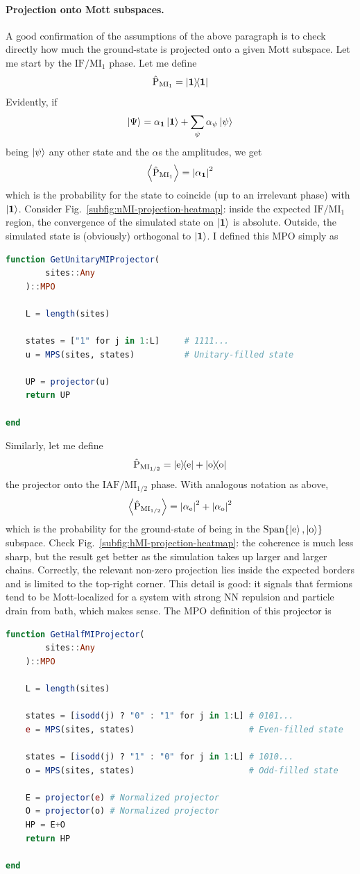\paragraph{Projection onto Mott subspaces.} A good confirmation of the assumptions of the above paragraph is to check directly how much the ground-state is projected onto a given Mott subspace. Let me start by the $\mathrm{IF}/\mathrm{MI}_1$ phase. Let me define
\[
	\hat{\mathrm{P}}_{\mathrm{MI}_1} = \op{\bm{1}}{\bm{1}}
\]
Evidently, if
\[
	\ket{\Psi} = \alpha_{\bm{1}} \ket{\bm{1}} + \sum_\psi \alpha_\psi \ket{\psi}
\]
being $\ket{\psi}$ any other state and the $\alpha$s the amplitudes, we get
\[
	\ev{\hat{\mathrm{P}}_{\mathrm{MI}_1}} = \abs{\alpha_{\bm{1}}}^2
\]
which is the probability for the state to coincide (up to an irrelevant phase) with $\ket{\bm{1}}$. Consider Fig.~\ref{subfig:uMI-projection-heatmap}: inside the expected $\mathrm{IF}/\mathrm{MI}_1$ region, the convergence of the simulated state on $\ket{\bm{1}}$ is absolute. Outside, the simulated state is (obviously) orthogonal to $\ket{\bm{1}}$. I defined this MPO simply as
\begin{lstlisting}[language=julia]
function GetUnitaryMIProjector(
		sites::Any
	)::MPO

	L = length(sites)
	
	states = ["1" for j in 1:L]		# 1111...
	u = MPS(sites, states)			# Unitary-filled state
	
	UP = projector(u)
	return UP

end
\end{lstlisting}

Similarly, let me define 
\[
	\hat{\mathrm{P}}_{\mathrm{MI}_{1/2}} = \op{\mathrm{e}}{\mathrm{e}} + \op{\mathrm{o}}{\mathrm{o}}
\]
the projector onto the $\mathrm{IAF}/\mathrm{MI}_{1/2}$ phase. With analogous notation as above,
\[
	\ev{\hat{\mathrm{P}}_{\mathrm{MI}_{1/2}}} = \abs{\alpha_\mathrm{e}}^2  + \abs{\alpha_\mathrm{o}}^2
\]
which is the probability for the ground-state of being in the $\mathrm{Span}\lbrace \ket{\mathrm{e}}, \ket{\mathrm{o}} \rbrace$ subspace. Check Fig.~\ref{subfig:hMI-projection-heatmap}: the coherence is much less sharp, but the result get better as the simulation takes up larger and larger chains. Correctly, the relevant non-zero projection lies inside the expected borders and is limited to the top-right corner. This detail is good: it signals that fermions tend to be Mott-localized for a system with strong NN repulsion and particle drain from bath, which makes sense. The MPO definition of this projector is
\begin{lstlisting}[language=julia]
function GetHalfMIProjector(
		sites::Any
	)::MPO
	
	L = length(sites)
	
	states = [isodd(j) ? "0" : "1" for j in 1:L] # 0101...
	e = MPS(sites, states)						 # Even-filled state
	
	states = [isodd(j) ? "1" : "0" for j in 1:L] # 1010...
	o = MPS(sites, states)						 # Odd-filled state
	
	E = projector(e) # Normalized projector
	O = projector(o) # Normalized projector
	HP = E+O
	return HP

end
\end{lstlisting}

